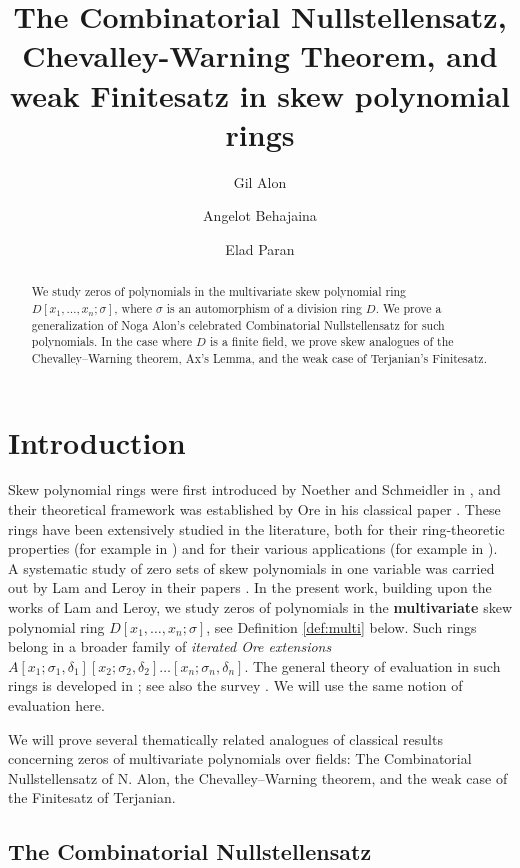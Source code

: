 \documentclass[11pt,reqno]{amsart}
\title[Nullstellensatz, Chevalley--Warning, and Finitesatz]{The Combinatorial Nullstellensatz, Chevalley-Warning Theorem, and weak Finitesatz in skew polynomial rings}
\author{Gil Alon}
\author{Angelot Behajaina}
\author{Elad Paran}
\theoremstyle{definition}
\begin{document}
\begin{abstract}
    We study zeros of polynomials in the multivariate skew polynomial ring $D[x_1,\ldots,x_n; \sigma]$, where $\sigma$ is an automorphism of a division ring $D$. We prove a generalization of Noga Alon's celebrated Combinatorial Nullstellensatz for such polynomials. In the case where $D$ is a finite field, we prove skew analogues of the Chevalley--Warning theorem, Ax's Lemma, and the weak case of Terjanian's Finitesatz.
\end{abstract}

\maketitle

\section{Introduction}


Skew polynomial rings were first introduced by Noether and Schmeidler in \cite{NS20}, and their theoretical framework was established by Ore in his classical paper \cite{Ore33}. These rings have been extensively studied in the literature, both for their ring-theoretic properties (for example in \cite{Jac37,Coh63,Jat71,Ram84,GL94,SZ02,MK19}) and for their various applications (for example in \cite{IM94,BU09,She20}). A systematic study of zero sets of skew polynomials in one variable was carried out by Lam and Leroy in their papers \cite{Lam86,VL88,LL04,LaL08}. 
In the present work, building upon the works of Lam and Leroy, we study zeros of polynomials in the {\bf multivariate} skew polynomial ring $D[x_1,\ldots,x_n;\sigma]$, see Definition \ref{def:multi} below. Such rings belong in a broader family of \emph{iterated Ore extensions} $A[x_1;\sigma_1,\delta_1][x_2; \sigma_2,\delta_2]\dotsc[x_n;\sigma_n,\delta_n]$. The general theory of evaluation in such rings is developed in \cite{LN25}; see also the survey \cite[\S7]{LM25}. We will use the same notion of evaluation here.

We will prove several thematically related analogues of classical results concerning zeros of multivariate polynomials over fields: The Combinatorial Nullstellensatz of N. Alon, the Chevalley--Warning theorem, and the weak case of the Finitesatz of Terjanian. 

\subsection{The Combinatorial Nullstellensatz}
\end{document}
